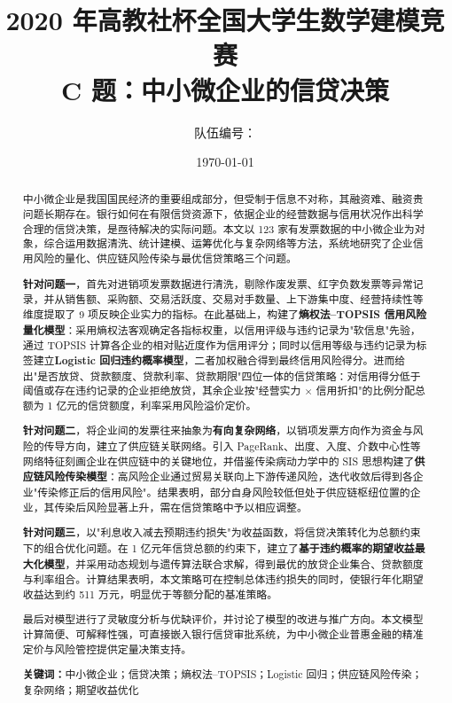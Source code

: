 \documentclass[12pt]{ctexart}
\title{\textbf{2020 年高教社杯全国大学生数学建模竞赛\\[0.3em]
\Large C 题：中小微企业的信贷决策}}
\author{队伍编号：\underline{\hspace{4em}}}
\date{\today}
\begin{document}
\maketitle

\begin{abstract}
中小微企业是我国国民经济的重要组成部分，但受制于信息不对称，其融资难、融资贵问题长期存在。银行如何在有限信贷资源下，依据企业的经营数据与信用状况作出科学合理的信贷决策，是亟待解决的实际问题。本文以 123 家有发票数据的中小微企业为对象，综合运用数据清洗、统计建模、运筹优化与复杂网络等方法，系统地研究了企业信用风险的量化、供应链风险传染与最优信贷策略三个问题。

\textbf{针对问题一}，首先对进销项发票数据进行清洗，剔除作废发票、红字负数发票等异常记录，并从销售额、采购额、交易活跃度、交易对手数量、上下游集中度、经营持续性等维度提取了 9 项反映企业实力的指标。在此基础上，构建了\textbf{熵权法--TOPSIS 信用风险量化模型}：采用熵权法客观确定各指标权重，以信用评级与违约记录为"软信息"先验，通过 TOPSIS 计算各企业的相对贴近度作为信用评分；同时以信用等级与违约记录为标签建立\textbf{Logistic 回归违约概率模型}，二者加权融合得到最终信用风险得分。进而给出"是否放贷、贷款额度、贷款利率、贷款期限"四位一体的信贷策略：对信用得分低于阈值或存在违约记录的企业拒绝放贷，其余企业按"经营实力 $\times$ 信用折扣"的比例分配总额为 1 亿元的信贷额度，利率采用风险溢价定价。

\textbf{针对问题二}，将企业间的发票往来抽象为\textbf{有向复杂网络}，以销项发票方向作为资金与风险的传导方向，建立了供应链关联网络。引入 PageRank、出度、入度、介数中心性等网络特征刻画企业在供应链中的关键地位，并借鉴传染病动力学中的 SIS 思想构建了\textbf{供应链风险传染模型}：高风险企业通过贸易关联向上下游传递风险，迭代收敛后得到各企业"传染修正后的信用风险"。结果表明，部分自身风险较低但处于供应链枢纽位置的企业，其传染后风险显著上升，需在信贷策略中予以相应调整。

\textbf{针对问题三}，以"利息收入减去预期违约损失"为收益函数，将信贷决策转化为总额约束下的组合优化问题。在 1 亿元年信贷总额的约束下，建立了\textbf{基于违约概率的期望收益最大化模型}，并采用动态规划与遗传算法联合求解，得到最优的放贷企业集合、贷款额度与利率组合。计算结果表明，本文策略可在控制总体违约损失的同时，使银行年化期望收益达到约 511 万元，明显优于等额分配的基准策略。

最后对模型进行了灵敏度分析与优缺评价，并讨论了模型的改进与推广方向。本文模型计算简便、可解释性强，可直接嵌入银行信贷审批系统，为中小微企业普惠金融的精准定价与风险管控提供定量决策支持。

\medskip
\noindent\textbf{关键词：}中小微企业；信贷决策；熵权法--TOPSIS；Logistic 回归；供应链风险传染；复杂网络；期望收益优化
\end{abstract}
\end{document}
